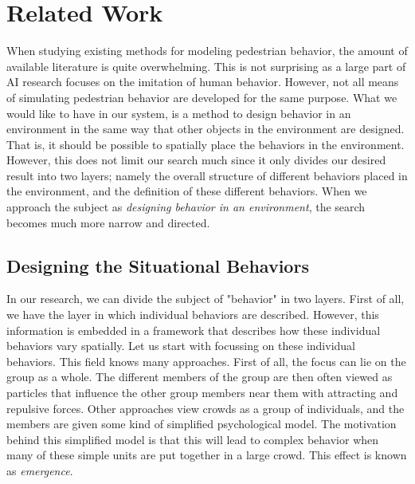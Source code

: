 \documentclass[11pt]{book}
\begin{document}
\chapter{Related Work}
When studying existing methods for modeling pedestrian behavior, the amount of available literature is quite overwhelming. This is not surprising as a large part of AI research focuses on the imitation of human behavior. However, not all means of simulating pedestrian behavior are developed for the same purpose. What we would like to have in our system, is a method to design behavior in an environment in the same way that other objects in the environment are designed. That is, it should be possible to spatially place the behaviors in the environment. However, this does not limit our search much since it only divides our desired result into two layers; namely the overall structure of different behaviors placed in the environment, and the definition of these different behaviors. When we approach the subject as \emph{designing behavior in an environment}, the search becomes much more narrow and directed.

\section{Designing the Situational Behaviors}
In our research, we can divide the subject of "behavior" in two layers.  First of all, we have the layer in which individual behaviors are described. However, this information is embedded in a framework that describes how these individual behaviors vary spatially. Let us start with focussing on these individual behaviors. This field knows many approaches. First of all, the focus can lie on the group as a whole. The different members of the group are then often viewed as particles that influence the other group members near them with attracting and repulsive forces. Other approaches view crowds as a group of individuals, and the members are given some kind of simplified psychological model. The motivation behind this simplified model is that this will lead to complex behavior when many of these simple units are put together in a large crowd. This effect is known as \emph{emergence}.\\
\end{document}
